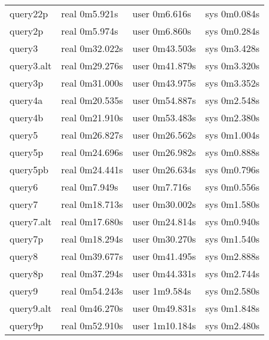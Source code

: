 \begin{tabular}{p{}|p{}|p{}|p{}}
query22p & real 0m5.921s & user 0m6.616s & sys 0m0.084s\\
query2p & real 0m5.974s & user 0m6.860s & sys 0m0.284s\\
query3 & real 0m32.022s & user 0m43.503s & sys 0m3.428s\\
query3.alt & real 0m29.276s & user 0m41.879s & sys 0m3.320s\\
query3p & real 0m31.000s & user 0m43.975s & sys 0m3.352s\\
query4a & real 0m20.535s & user 0m54.887s & sys 0m2.548s\\
query4b & real 0m21.910s & user 0m53.483s & sys 0m2.380s\\
query5 & real 0m26.827s & user 0m26.562s & sys 0m1.004s\\
query5p & real 0m24.696s & user 0m26.982s & sys 0m0.888s\\
query5pb & real 0m24.441s & user 0m26.634s & sys 0m0.796s\\
query6 & real 0m7.949s & user 0m7.716s & sys 0m0.556s\\
query7 & real 0m18.713s & user 0m30.002s & sys 0m1.580s\\
query7.alt & real 0m17.680s & user 0m24.814s & sys 0m0.940s\\
query7p & real 0m18.294s & user 0m30.270s & sys 0m1.540s\\
query8 & real 0m39.677s & user 0m41.495s & sys 0m2.888s\\
query8p & real 0m37.294s & user 0m44.331s & sys 0m2.744s\\
query9 & real 0m54.243s & user 1m9.584s & sys 0m2.580s\\
query9.alt & real 0m46.270s & user 0m49.831s & sys 0m1.848s\\
query9p & real 0m52.910s & user 1m10.184s & sys 0m2.480s\\
\end{tabular}

